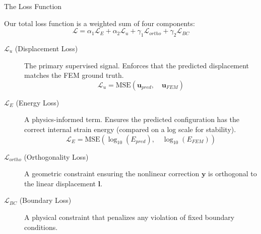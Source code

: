 \documentclass{beamer}
\begin{document}
\begin{frame}[allowframebreaks]{The Loss Function}
    
    Our total loss function is a weighted sum of four components:
    \begin{equation*}
        \mathcal{L} = \alpha_1 \mathcal{L}_E + \alpha_2 \mathcal{L}_u + \gamma_1 \mathcal{L}_{ortho} + \gamma_2 \mathcal{L}_{BC}
    \end{equation*}
    
    \begin{description}
        \item[\(\mathcal{L}_u\) (Displacement Loss)] The primary supervised signal. Enforces that the predicted displacement matches the FEM ground truth.
        \begin{equation*}
            \mathcal{L}_u = \text{MSE}(\bm{u}_{pred}, \quad \bm{u}_{FEM})
        \end{equation*}
        
        \item[\(\mathcal{L}_E\) (Energy Loss)] A physics-informed term. Ensures the predicted configuration has the correct internal strain energy (compared on a log scale for stability).
        \begin{equation*}
            \mathcal{L}_E = \text{MSE}(\log_{10}(E_{pred}), \quad \log_{10}(E_{FEM}))
        \end{equation*}
        
        \item[\(\mathcal{L}_{ortho}\) (Orthogonality Loss)] A geometric constraint ensuring the nonlinear correction \(\bm{y}\) is orthogonal to the linear displacement \(\bm{l}\).
        
        \item[\(\mathcal{L}_{BC}\) (Boundary Loss)] A physical constraint that penalizes any violation of fixed boundary conditions.
    \end{description}
\end{frame}
\end{document}
